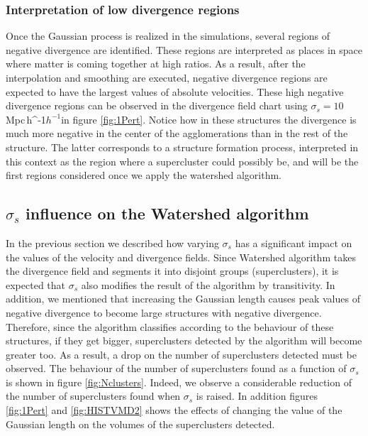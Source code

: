 \documentclass[usenatbib]{mnras}
\newcommand{\Mpch}{\,{\rm Mpc}\,\ifmmode h^{-1}\else $h^{-1}$\fi}
\begin{document}
\subsubsection{Interpretation of low divergence regions}
Once the Gaussian process is realized in the simulations, several regions of negative divergence are identified. These regions are interpreted as places in space where matter is coming together at high ratios. As a result, after the interpolation and smoothing are executed, negative divergence regions are expected to have the largest values of absolute velocities. These high negative divergence regions can be observed in the divergence field chart using $\sigma_s = 10$\,\Mpch in figure \ref{fig:1Pert}. Notice how in these structures the divergence is much more negative in the center of the agglomerations than in the rest of the structure. The latter corresponds to a structure formation process, interpreted in this context as the region where a supercluster could possibly be, and will be the first regions considered once we apply the watershed algorithm.


\subsection{$\sigma_s$ influence on the Watershed algorithm}


In the previous section we described how varying $\sigma_s$ has a significant impact on the values of the velocity and divergence fields. Since Watershed algorithm takes the divergence field and segments it into disjoint groups (superclusters), it is expected that $\sigma_s$ also modifies the result of the algorithm by transitivity. In addition, we mentioned that increasing the Gaussian length causes peak values of negative divergence to become large structures with negative divergence. Therefore, since the algorithm classifies according to the behaviour of these structures, if they get bigger, superclusters detected by the algorithm will become greater too. As a result, a drop on the number of superclusters detected must be observed. The behaviour of the number of superclusters found as a function of $\sigma_s$ is shown in figure \ref{fig:Nclusters}. Indeed, we observe a considerable reduction of the number of superclusters found when $\sigma_s$ is raised. In addition figures \ref{fig:1Pert} and \ref{fig:HISTVMD2} shows the effects of changing the value of the Gaussian length on the volumes of the superclusters detected.
\end{document}
